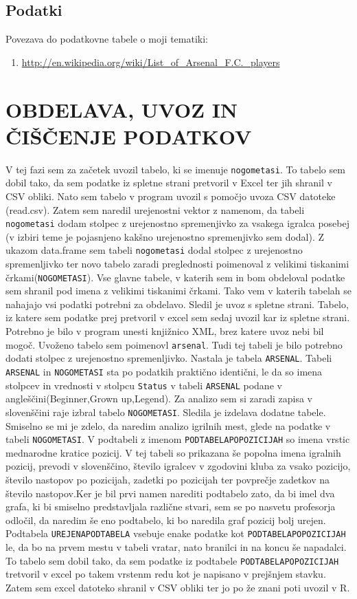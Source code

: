 \documentclass[11pt,a4paper]{article}
\begin{document}
\subsection{Podatki}
Povezava do podatkovne tabele o moji tematiki: 
\begin{enumerate}
\item{\url{http://en.wikipedia.org/wiki/List_of_Arsenal_F.C._players}}
\end{enumerate}

\section{OBDELAVA, UVOZ IN ČIŠČENJE PODATKOV}
V tej fazi sem za začetek uvozil tabelo, ki se imenuje \verb|nogometasi|. To tabelo sem dobil tako, da sem podatke iz spletne strani pretvoril v Excel ter jih shranil v CSV obliki. Nato sem tabelo v program uvozil s pomočjo uvoza CSV datoteke (read.csv). Zatem sem naredil urejenostni vektor z namenom, da tabeli \verb|nogometasi| dodam stolpec z urejenostno spremenjivko za vsakega igralca posebej (v izbiri teme je pojasnjeno kakšno urejenostno spremenjivko sem dodal). Z ukazom data.frame sem tabeli \verb|nogometasi| dodal stolpec z urejenostno spremenljivko ter novo tabelo zaradi preglednosti poimenoval z velikimi tiskanimi črkami(\verb|NOGOMETASI|). Vse glavne tabele, v katerih sem in bom obdeloval podatke sem shranil pod imena z velikimi tiskanimi črkami. Tako vem v katerih tabelah se nahajajo vsi podatki potrebni za obdelavo.
Sledil je uvoz s spletne strani. Tabelo, iz katere sem podatke prej pretvoril v excel sem sedaj uvozil kar iz spletne strani. Potrebno je bilo v program unesti knjižnico XML, brez katere uvoz nebi bil mogoč. Uvoženo tabelo sem poimenovl \verb|arsenal|. Tudi tej tabeli je bilo potrebno dodati stolpec z urejenostno spremenljivko. Nastala je tabela \verb|ARSENAL|. Tabeli \verb|ARSENAL| in \verb|NOGOMETASI| sta po podatkih praktično identični, le da so imena stolpcev in vrednosti v stolpcu  \verb|Status| v tabeli \verb|ARSENAL| podane v angleščini(Beginner,Grown up,Legend). Za analizo sem si zaradi zapisa v slovenščini raje izbral tabelo \verb|NOGOMETASI|.
Sledila je izdelava dodatne tabele. Smiselno se mi je zdelo, da naredim analizo igrilnih mest, glede na podatke v tabeli \verb|NOGOMETASI|. V podtabeli z imenom \verb|PODTABELAPOPOZICIJAH| so imena vrstic mednarodne kratice pozicij. V tej tabeli so prikazana še popolna imena igralnih pozicij, prevodi v slovenščino, število igralcev v zgodovini kluba za vsako pozicijo, število nastopov po pozicijah, zadetki po pozicijah ter povprečje zadetkov na število nastopov.Ker je bil prvi namen narediti podtabelo zato, da bi imel dva grafa, ki bi smiselno predstavljala različne stvari, sem se po nasvetu profesorja odločil, da naredim še eno podtabelo, ki bo naredila graf pozicij bolj urejen. Podtabela \verb|UREJENAPODTABELA| vsebuje enake podatke kot \verb|PODTABELAPOPOZICIJAH| le, da bo na prvem mestu v tabeli vratar, nato branilci in na koncu še napadalci. To tabelo sem dobil tako, da sem podatke iz podtabele \verb|PODTABELAPOPOZICIJAH| tretvoril v excel po takem vrstenm redu kot je napisano v prejšnjem stavku. Zatem sem excel datoteko shranil v CSV obliki ter jo po že znani poti uvozil v R.
\end{document}
